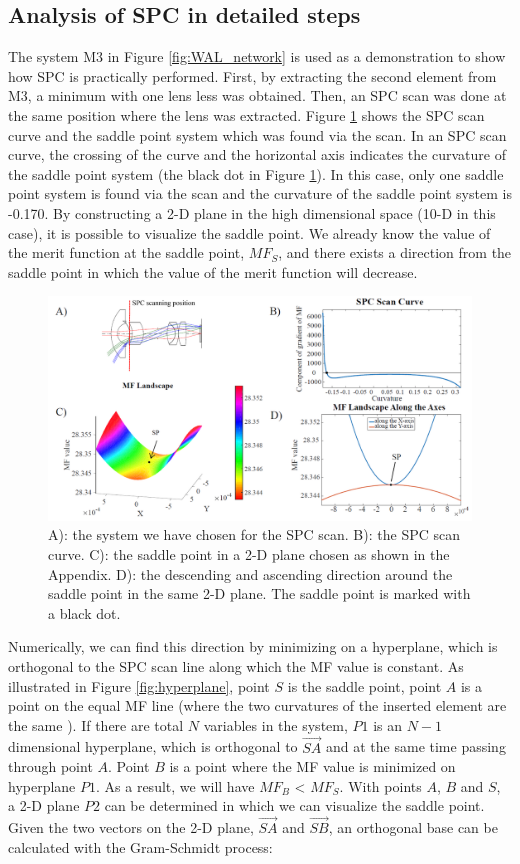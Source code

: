 \subsection{Analysis of SPC in detailed steps}
The system M3 in Figure \ref{fig:WAL_network} is used as a demonstration to show how SPC is practically performed. First, by extracting the second element from M3, a minimum with one lens less was obtained. Then, an SPC scan was done at the same position where the lens was extracted. Figure \ref{fig:WAL_demo_sp} shows the SPC scan curve and the saddle point system which was found via the scan. In an SPC scan curve, the crossing of the curve and the horizontal axis indicates the curvature of the saddle point system (the black dot in Figure \ref{fig:WAL_demo_sp}). In this case, only one saddle point system is found via the scan and the curvature of the saddle point system is -0.170. By constructing a 2-D plane in the high dimensional space (10-D in this case), it is possible to visualize the saddle point. We already know the value of the merit function at the saddle point, $MF_{S}$, and there exists a direction from the saddle point in which the value of the merit function will decrease. 
\begin{figure}[h!]
    \centering
    \includegraphics[width=\textwidth]{chapter-4/figures/WAL_demo_sp_2.png}
    \caption{A): the system we have chosen for the SPC scan. B): the SPC scan curve. C): the saddle point in a 2-D plane chosen as shown in the Appendix. D): the descending and ascending direction around the saddle point in the same 2-D plane. The saddle point is marked with a black dot.}
    \label{fig:WAL_demo_sp}
\end{figure}
Numerically, we can find this direction by minimizing on a hyperplane, which is orthogonal to the SPC scan line along which the MF value is constant. As illustrated in Figure \ref{fig:hyperplane}, point $S$ is the saddle point, point $A$ is a point on the equal MF line (where the two curvatures of the inserted element are the same \cite{MVTurnhoutSPC15}). If there are total $N$ variables in the system, $P1$ is an $N-1$ dimensional hyperplane, which is orthogonal to $\overrightarrow{SA}$ and at the same time passing through point $A$. Point $B$ is a point where the MF value is minimized on hyperplane $P1$. As a result, we will have $MF_{B}$ < $MF_{S}$. With points $A$, $B$ and $S$, a 2-D plane $P2$ can be determined in which we can visualize the saddle point. Given the two vectors on the 2-D plane, $\overrightarrow{SA}$ and $\overrightarrow{SB}$, an orthogonal base can be calculated with the Gram-Schmidt process:

